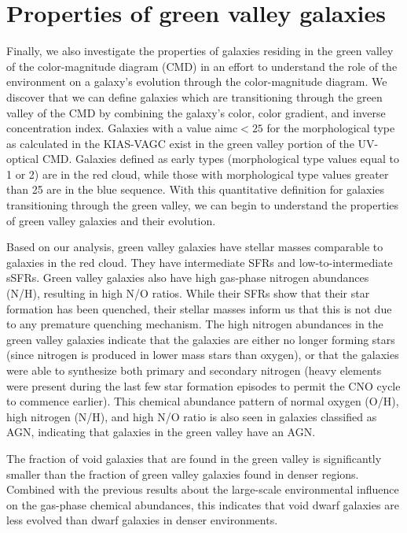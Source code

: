 \section[GV galaxies]{Properties of green valley galaxies}
Finally, we also investigate the properties of galaxies residing in the green 
valley of the color-magnitude diagram (CMD) in an effort to understand the role 
of the environment on a galaxy's evolution through the color-magnitude diagram.  
We discover that we can define galaxies which are transitioning through the 
green valley of the CMD by combining the galaxy's color, color gradient, and 
inverse concentration index.  Galaxies with a value aimc$< 25$ for the 
morphological type as calculated in the KIAS-VAGC exist in the green valley 
portion of the UV-optical CMD.  Galaxies defined as early types (morphological 
type values equal to 1 or 2) are in the red cloud, while those with 
morphological type values greater than 25 are in the blue sequence.  With this 
quantitative definition for galaxies transitioning through the green valley, we 
can begin to understand the properties of green valley galaxies and their 
evolution.

Based on our analysis, green valley galaxies have stellar masses comparable to 
galaxies in the red cloud.  They have intermediate SFRs and low-to-intermediate 
sSFRs.  Green valley galaxies also have high gas-phase nitrogen abundances 
(N/H), resulting in high N/O ratios.  While their SFRs show that their star 
formation has been quenched, their stellar masses inform us that this is not due 
to any premature quenching mechanism.  The high nitrogen abundances in the green 
valley galaxies indicate that the galaxies are either no longer forming stars 
(since nitrogen is produced in lower mass stars than oxygen), or that the 
galaxies were able to synthesize both primary and secondary nitrogen (heavy 
elements were present during the last few star formation episodes to permit the 
CNO cycle to commence earlier).  This chemical abundance pattern of normal 
oxygen (O/H), high nitrogen (N/H), and high N/O ratio is also seen in galaxies 
classified as AGN, indicating that galaxies in the green valley have an AGN.

The fraction of void galaxies that are found in the green valley is 
significantly smaller than the fraction of green valley galaxies found in denser 
regions.  Combined with the previous results about the large-scale environmental 
influence on the gas-phase chemical abundances, this indicates that void dwarf 
galaxies are less evolved than dwarf galaxies in denser environments.


